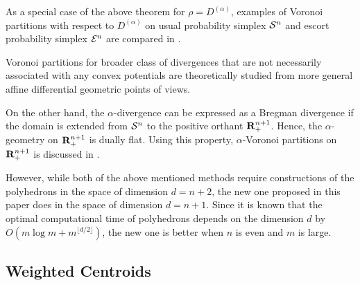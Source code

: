 \documentclass{llncs}
\begin{document}
As a special case of the above theorem for $\rho=D^{(\alpha)}$, 
examples of Voronoi partitions with respect to $D^{(\alpha)}$ on 
usual probability simplex ${\cal S}^n$ and escort probability simplex 
${\cal E}^n$ are compared in \cite{OMA12}.



\medskip
\begin{remark} 
Voronoi partitions for broader class of divergences 
that are not necessarily associated with any convex potentials are 
theoretically studied \cite{Matsu2} from more general 
affine differential geometric points of views.

On the other hand, the $\alpha$-divergence can be expressed 
as a Bregman divergence if the domain is extended from ${\cal S}^n$ 
to the positive orthant ${\bf R}_+^{n+1}$.\cite{Amari85,AN,Ohara07}
Hence, the $\alpha$-geometry on ${\bf R}_+^{n+1}$ is dually flat.
Using this property, $\alpha$-Voronoi partitions on ${\bf R}_+^{n+1}$ is 
discussed in \cite{NN}.

However, while both of the above mentioned methods require 
constructions of the polyhedrons in the space of dimension $d=n+2$, 
the new one proposed in this paper does in the space of dimension $d=n+1$.
Since it is known \cite{Chaz} that 
the optimal computational time of polyhedrons 
depends on the dimension $d$ by $O(m\log m+m^{\lfloor d/2 \rfloor})$, 
the new one is better when $n$ is even and $m$ is large.
\end{remark}

\medskip

\subsection{Weighted Centroids}
\end{document}
